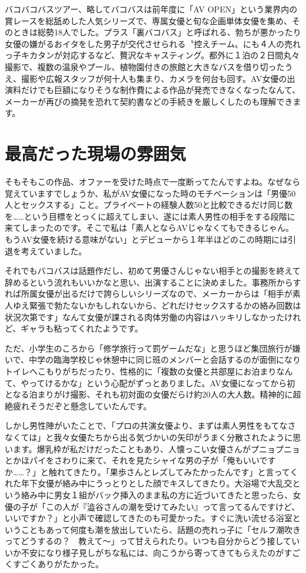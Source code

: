 \documentclass[12pt,UTF8]{ctexbook}
\begin{document}
バコバコバスツアー、略してバコバスは前年度に「AV OPEN」という業界内の賞レースを総舐めした人気シリーズで、専属女優と旬な企画単体女優を集め、そのときは総勢18人でした。プラス「裏バコバス」と呼ばれる、勃ちが悪かったり女優の嫌がるおイタをした男子が交代させられる〝控えチーム〟にも４人の売れっ子キカタンが対応するなど、贅沢なキャスティング。都外に１泊の２日間丸々撮影で、複数の温泉やプール、植物園付きの旅館と大きなバスを借り切ったうえ、撮影や広報スタッフが何十人も集まり、カメラを何台も回す。AV女優の出演料だけでも巨額になりそうな制作費による作品が発売できなくなったなんて、メーカーが再びの摘発を恐れて契約書などの手続きを厳しくしたのも理解できます。

\section{最高だった現場の雰囲気}

そもそもこの作品、オファーを受けた時点で一度断ってたんですよね。なぜなら覚えていますでしょうか、私がAV女優になった時のモチベーションは「男優50人とセックスする」こと。プライベートの経験人数50と比較できるだけ同じ数を……という目標をとっくに超えてしまい、遂には素人男性の相手をする段階に来てしまったのです。そこで私は「素人とならAVじゃなくてもできるじゃん。もうAV女優を続ける意味がない」とデビューから１年半ほどのこの時期には引退を考えていました。

それでもバコバスは話題作だし、初めて男優さんじゃない相手との撮影を終えて辞めるという流れもいいかなと思い、出演することに決めました。事務所からすれば所属女優が出るだけで誇らしいシリーズなので、メーカーからは「相手が素人ゆえ緊張で勃たないかもしれないから、どれだけセックスするかの絡み回数は状況次第です」なんて女優が課される肉体労働の内容はハッキリしなかったけれど、ギャラも粘ってくれたようです。

ただ、小学生のころから「修学旅行って罰ゲームだな」と思うほど集団旅行が嫌いで、中学の臨海学校じゃ休憩中に同じ班のメンバーと会話するのが面倒になりトイレへこもりがちだったり、性格的に「複数の女優と共部屋にお泊まりなんて、やってけるかな」という心配がずっとありました。AV女優になってから初となる泊まりがけ撮影、それも初対面の女優だらけ約20人の大人数。精神的に超絶疲れそうだぞと懸念していたんです。

しかし男性陣がいたことで、「プロの共演女優より、まずは素人男性をもてなさなくては」と我々女優たちから出る気づかいの矢印がうまく分散されたように思います。爆乳枠が私だけだったこともあり、人懐っこい女優さんがプニョプニョとかほパイをさわりに来て、それを見たシャイな男の子が「俺もいいですか……？」と触れてきたり。「果歩さんとレズしてみたかったんです」と言ってくれた年下女優が絡み中にうっとりとした顔でキスしてきたり。大浴場で大乱交という絡み中に男女１組がバック挿入のまま私の方に近づいてきたと思ったら、女優の子が「この人が『澁谷さんの潮を受けてみたい』って言ってるんですけど、いいですか？」と小声で確認してきたのも可愛かった。すぐに洗い流せる浴室ということもあって何度も潮を放出していたら、話題の売れっ子に「セルフ潮吹きってどうするの？　教えて〜」って甘えられたり。いつも自分からどう接していいか不安になり様子見しがちな私には、向こうから寄ってきてもらえたのがすごくすごくありがたかった。
\end{document}
